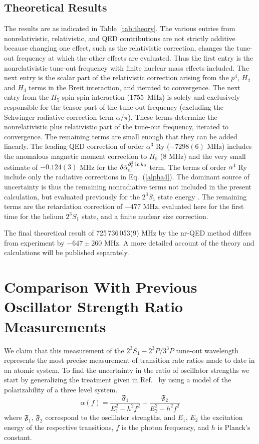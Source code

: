 \documentclass[%
 amsmath,amssymb,
aps,
]{revtex4-2}
\newcommand{\MetastableState}{2^{3\!}S_1}%
\newcommand{\UpperStateManifold}{3^{3\!}P}%
\newcommand{\LowerStateManifold}{2^{3\!}P}%
\newcommand{\TO}{\MetastableState- \LowerStateManifold / \UpperStateManifold}%
\begin{document}
\subsection{Theoretical Results}
The results are as indicated in Table~\ref{tab:theory}. The various entries from nonrelativistic, relativistic, and QED contributions are not strictly additive because changing one effect, such as the relativistic correction, changes the tune-out frequency at which the other effects are evaluated.  Thus the first entry is the nonrelativistic tune-out frequency with finite nuclear mass effects included.  The next entry is the scalar part of the relativistic correction arising from the $p^4$, $H_2$ and $H_4$ terms in the Breit interaction, and iterated to convergence.  The next entry from the $H_5$ spin-spin interaction (1755~MHz) is solely and exclusively responsible for the tensor part of the tune-out frequency (excluding the Schwinger radiative correction term $\alpha/\pi$).  These terms determine the nonrelativistic plus relativistic part of the tune-out frequency, iterated to convergence.  The remaining terms are small enough that they can be added linearly.  The leading QED correction of order $\alpha^3$ Ry ($-7298(6)$ MHz) includes the anomalous magnetic moment correction to $H_5$ (8 MHz) and the very small estimate of $-0.124(3)$ MHz for the $\delta\bar{\alpha}_{\rm d}^{\partial_{\cal E}^2\ln k_0}$ term.  The terms of order $\alpha^4$ Ry include only the radiative corrections in Eq.~(\ref{alpha4}).  The dominant source of uncertainty is thus the remaining nonradiative terms not included in the present calculation, but evaluated previously for the $2^3S_1$ state energy \cite{Pachucki2006}.  The remaining terms are the retardation correction of $-477$ MHz, evaluated here for the first time for the helium $2^3S_1$ state, and a finite nuclear size correction.

The final theoretical result of 725\,736\,053(9) MHz by the nr-QED method differs from experiment by $-647\pm260$ MHz.  A more detailed account of the theory and calculations will be published separately.

\section{Comparison With Previous Oscillator Strength Ratio Measurements}
We claim that this measurement of the $\TO$ tune-out wavelength represents the most precise measurement of transition rate ratios made to date in an atomic system. To find the uncertainty in the ratio of oscillator strengths we start by generalizing the treatment given in Ref.~\cite{PhysRevA.88.052515} by using a model of the polarizability of a three level system.
\begin{equation}
\alpha(f) = \frac{\mathfrak{F}_1}{E_1^2-h^2 f^2}+\frac{\mathfrak{F}_2}{E_2^2-h^2 f^2}
\end{equation}
where $\mathfrak{F}_1$, $\mathfrak{F}_2$ correspond to the oscillator strengths, and $E_1$, $E_2$ the excitation energy of the respective transitions, $f$ is the photon frequency, and \(h\) is Planck's constant. 
\end{document}
